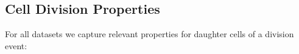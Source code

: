 \documentclass[11pt,a4paper, final]{article}
\newcommand{\TODO}[1]{
\textcolor{red}{TODO:#1}
}
\newenvironment{Itemize}{
 \begin{itemize}[leftmargin=0.5cm]{
}}{\end{itemize}}
\begin{document}

\subsection{Cell Division Properties}
\noindent
For all datasets we capture relevant properties for daughter cells of a division event:
\end{document}
